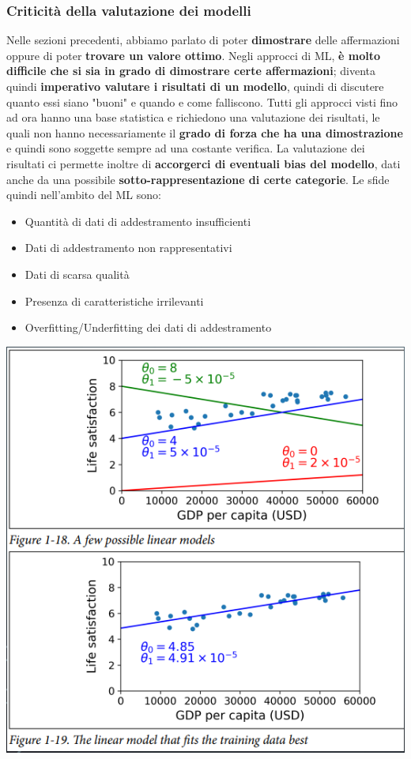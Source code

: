 \documentclass[12pt]{article}
\begin{document}
\subsubsection{Criticità della valutazione dei modelli}
Nelle sezioni precedenti, abbiamo parlato di poter \textbf{dimostrare} delle affermazioni oppure di poter \textbf{trovare un valore ottimo}.
Negli approcci di ML, \textbf{è molto difficile che si sia in grado di dimostrare certe affermazioni}; diventa quindi \textbf{imperativo valutare i risultati di un modello},
quindi di discutere quanto essi siano "buoni" e quando e come falliscono. Tutti gli approcci visti fino ad ora hanno una base statistica e richiedono una valutazione dei risultati, le quali
non hanno necessariamente il \textbf{grado di forza che ha una dimostrazione} e quindi sono soggette sempre ad una costante verifica.
La valutazione dei risultati ci permette inoltre di \textbf{accorgerci di eventuali bias del modello}, dati anche da una possibile \textbf{sotto-rappresentazione di certe categorie}.
Le sfide quindi nell'ambito del ML sono:
\begin{itemize}
    \item Quantità di dati di addestramento insufficienti
    \item Dati di addestramento non rappresentativi
    \item Dati di scarsa qualità
    \item Presenza di caratteristiche irrilevanti
    \item Overfitting/Underfitting dei dati di addestramento
\end{itemize}
\begin{center}
    \includegraphics[width =0.80\linewidth]{Images/66.PNG}
\end{center}
\end{document}
